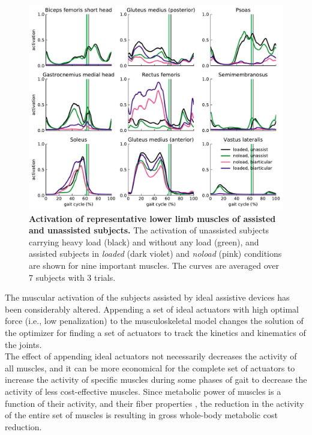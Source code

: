 \documentclass[10pt,letterpaper]{article}
\begin{document}
\begin{figure}[ht]   
	\centering
	\includegraphics[width=\linewidth]{Ideal_Exo_MonovsBi_Figures/PaperFigure_Biarticular_MuscleActivation.pdf}
	\vspace{1mm}
	\caption{{\small\textbf{Activation of representative lower limb muscles of assisted and unassisted subjects.} The activation of unassisted subjects carrying heavy load (black) and without any load (green), and assisted subjects in \textit{loaded} (dark violet) and \textit{noload} (pink) conditions are shown for nine important muscles. The curves are averaged over 7 subjects with 3 trials.}}
	\label{Fig_IdealExo_MusclesActivation}
\end{figure}
The muscular activation of the subjects assisted by ideal assistive devices has been considerably altered. Appending a set of ideal actuators with high optimal force (i.e., low penalization) to the musculoskeletal model changes the solution of the optimizer for finding a set of actuators to track the kinetics and kinematics of the joints.\\
The effect of appending ideal actuators not necessarily decreases the activity of all muscles, and it can be more economical for the complete set of actuators to increase the activity of specific muscles during some phases of gait to decrease the activity of less cost-effective muscles. Since metabolic power of muscles is a function of their activity, and their fiber properties \cite{106}, the reduction in the activity of the entire set of muscles is resulting in gross whole-body metabolic cost reduction.\\
\end{document}
